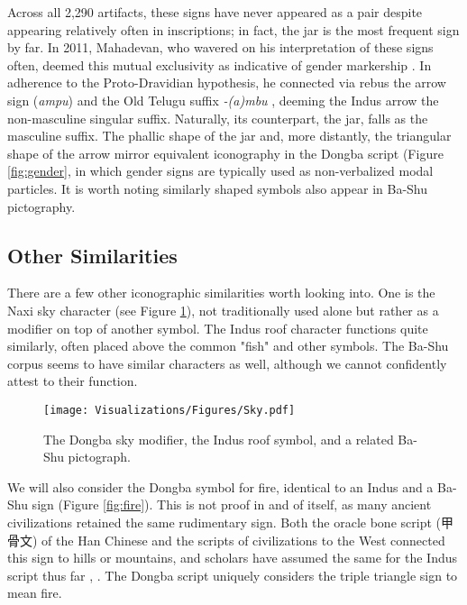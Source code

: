 \documentclass[11pt,a4paper,oneside]{report}
\begin{document}
Across all 2,290 artifacts, these signs have never appeared as a pair despite appearing relatively often in inscriptions; in fact, the jar is the most frequent sign by far. In 2011, Mahadevan, who wavered on his interpretation of these signs often, deemed this mutual exclusivity as indicative of gender markership \cite{mahadevan_indus_2011}. In adherence to the Proto-Dravidian hypothesis, he connected via rebus the arrow sign (\textit{ampu}) and the Old Telugu suffix \textit{-(a)mbu} \cite{sastri_historical_1969}, deeming the Indus arrow the non-masculine singular suffix. Naturally, its counterpart, the jar, falls as the masculine suffix. The phallic shape of the jar and, more distantly, the triangular shape of the arrow mirror equivalent iconography in the Dongba script (Figure \ref{fig:gender}, in which gender signs are typically used as non-verbalized modal particles. It is worth noting similarly shaped symbols also appear in Ba-Shu pictography.

\subsection{Other Similarities}
\noindent\hspace{1cm}
There are a few other iconographic similarities worth looking into. One is the Naxi sky character (see Figure \ref{fig:sky}), not traditionally used alone but rather as a modifier on top of another symbol. The Indus roof character functions quite similarly, often placed above the common "fish" and other symbols. The Ba-Shu corpus seems to have similar characters as well, although we cannot confidently attest to their function.

\begin{figure}[H] 
    \centering
    \texttt{[image: Visualizations/Figures/Sky.pdf]}
    \caption[Indus vs. Dongba Sky Symbol Comparison Chart]{The Dongba sky modifier, the Indus roof symbol, and a related Ba-Shu pictograph.}
    \label{fig:sky}
\end{figure}

We will also consider the Dongba symbol for fire, identical to an Indus and a Ba-Shu sign (Figure \ref{fig:fire}). This is not proof in and of itself, as many ancient civilizations retained the same rudimentary sign. Both the oracle bone script (甲骨文) of the Han Chinese and the scripts of civilizations to the West connected this sign to hills or mountains, and scholars have assumed the same for the Indus script thus far \cite{parpola_deciphering_1994}, \cite{mahadevan_akam_2010}. The Dongba script uniquely considers the triple triangle sign to mean fire.
\end{document}
